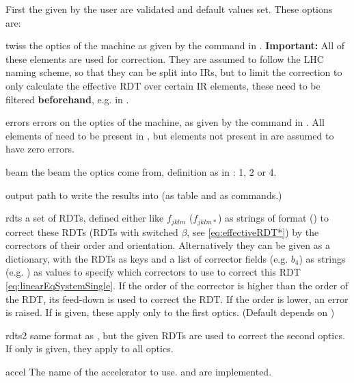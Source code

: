 First the  given by the user are validated and default values set.
These options are:
\begin{options}
        \item[twiss] the optics of the machine as given by the  command in .
                     \textbf{Important:} All of these elements are used for correction. 
                     They are assumed to follow the LHC naming scheme, so that they can be split into IRs, 
                     but to limit the correction to only calculate the effective RDT over certain IR elements,
                     these need to be filtered \textbf{beforehand}, e.g. in .
        \item[errors] errors on the optics of the machine, 
                      as given by the  command in .
                      All elements of  need to be present in ,
                      but elements not present in  are assumed to have zero errors.
        \item[beam] the beam the optics come from, definition as in : 1, 2 or 4.
        \item[output] path to write the results into (as table and as  commands.)
        \item[rdts] a set of RDTs, defined either like $f_{jklm}$ ($f_{jklm*}$) as strings of format
                     () to correct
                    these RDTs (RDTs with switched $\beta$, see \cref{eq:effectiveRDT*}) 
                    by the correctors of their order and orientation.
                    Alternatively they can be given as a dictionary, with the RDTs as keys
                    and a list of corrector fields (e.g. $b_4$) as strings (e.g. ) 
                    as values to specify which correctors to use to correct this RDT \cref{eq:linearEqSystemSingle}. 
                    If the order of the corrector is higher than the order of the RDT, its feed-down
                    is used to correct the RDT. If the order is lower, an error is raised.
                    If  is given, these apply only  to the first optics. 
                    (Default depends on )
        \item[rdts2] same format as , but the given RDTs are used to correct the second optics.
                     If only  is given, they apply to all optics.
        \item[accel] The name of the accelerator to use.  and  are implemented.

\end{options}
